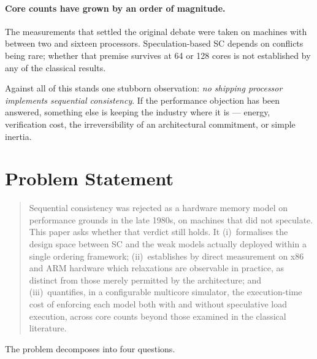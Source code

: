 \paragraph{Core counts have grown by an order of magnitude.} The measurements that
settled the original debate were taken on machines with between two and sixteen
processors.
Speculation-based SC depends on conflicts being rare; whether that
premise survives at 64 or 128 cores is not established by any of the classical
results.

Against all of this stands one stubborn observation: \emph{no shipping processor
implements sequential consistency}.
If the performance objection has been answered,
something else is keeping the industry where it is --- energy, verification cost,
the irreversibility of an architectural commitment, or simple inertia.

\section{Problem Statement}
\label{sec:problem}

\begin{quote}
Sequential consistency was rejected as a hardware memory model on performance
grounds in the late 1980s, on machines that did not speculate.
This paper asks
whether that verdict still holds.
It (i)~formalises the design space between SC
and the weak models actually deployed within a single ordering framework;
(ii)~establishes by direct measurement on x86 and ARM hardware which relaxations
are observable in practice, as distinct from those merely permitted by the
architecture; and (iii)~quantifies, in a configurable multicore simulator, the
execution-time cost of enforcing each model both with and without speculative
load execution, across core counts beyond those examined in the classical
literature.
\end{quote}

\noindent The problem decomposes into four questions.

